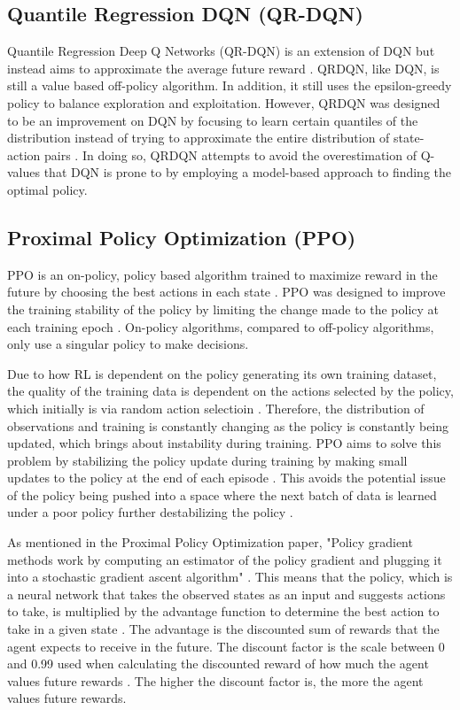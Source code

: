 \subsection{Quantile Regression DQN (QR-DQN)}

Quantile Regression Deep Q Networks (QR-DQN) is an extension of DQN but instead aims to approximate the average future reward \cite{dabney2018distributional}. QRDQN, like DQN, is still a value based off-policy algorithm. In addition, it still uses the epsilon-greedy policy to balance exploration and exploitation. However, QRDQN was designed to be an improvement on DQN by focusing to learn certain quantiles of the distribution instead of trying to approximate the entire distribution of state-action pairs \cite{dabney2018distributional}. In doing so, QRDQN attempts to avoid the overestimation of Q-values that DQN is prone to by employing a model-based approach to finding the optimal policy.

\subsection{Proximal Policy Optimization (PPO)}

PPO is an on-policy, policy based algorithm trained to maximize reward in the future by choosing the best actions in each state \cite{deepcheckRL}. PPO was designed to improve the training stability of the policy by limiting the change made to the policy at each training epoch \cite{ThomasSimonini2022A2C}. On-policy algorithms, compared to off-policy algorithms, only use a singular policy to make decisions.

Due to how RL is dependent on the policy generating its own training dataset, the quality of the training data is dependent on the actions selected by the policy, which initially is via random action selectioin \cite{XanderSteenbrugge2019ppo}. Therefore, the distribution of observations and training is constantly changing as the policy is constantly being updated, which brings about instability during training. PPO aims to solve this problem by stabilizing the policy update during training by making small updates to the policy at the end of each episode \cite{XanderSteenbrugge2019intro}. This avoids the potential issue of the policy being pushed into a space where the next batch of data is learned under a poor policy further destabilizing the policy \cite{XanderSteenbrugge2019ppo}.

As mentioned in the Proximal Policy Optimization paper, "Policy gradient methods work by computing an estimator of the policy gradient and plugging it into a stochastic gradient ascent algorithm" \cite{schulman2017proximal}. This means that the policy, which is a neural network that takes the observed states as an input and suggests actions to take, is multiplied by the advantage function to determine the best action to take in a given state \cite{schulman2017proximal}. The advantage is the discounted sum of rewards that the agent expects to receive in the future. The discount factor is the scale between 0 and 0.99 used when calculating the discounted reward of how much the agent values future rewards \cite{XanderSteenbrugge2019ppo}. The higher the discount factor is, the more the agent values future rewards. 

